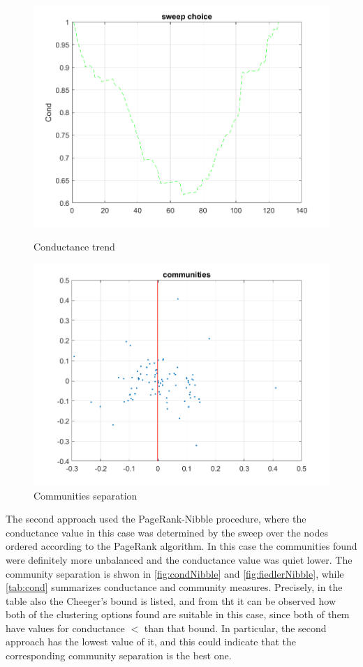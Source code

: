 \documentclass[12pt,a4paper]{article}
\begin{document}
\begin{figure}
\centering
\begin{minipage}{.47\textwidth}
  \includegraphics[width = \textwidth]{img/Conductance}
  \caption{Conductance trend}
  \label{fig:cond}
\end{minipage}
\begin{minipage}{.47\textwidth}
  \includegraphics[width = \textwidth]{img/Communities}
  \caption{Communities separation}
  \label{fig:fiedler}
\end{minipage}
\end{figure}
The second approach used the PageRank-Nibble procedure, where the conductance value in this case was determined by the sweep over the nodes ordered according to the PageRank algorithm. In this case the communities found were definitely more unbalanced and the conductance value was quiet lower. The community separation is shwon in \autoref{fig:condNibble} and \autoref{fig:fiedlerNibble}, while \autoref{tab:cond} summarizes conductance and community measures. Precisely, in the table also the Cheeger's bound is listed, and from tht it can be observed how both of the clustering options found are suitable in this case, since both of them have values for conductance $<$ than that bound. In particular, the second approach has the lowest value of it, and this could indicate that the corresponding community separation is the best one.
\end{document}
